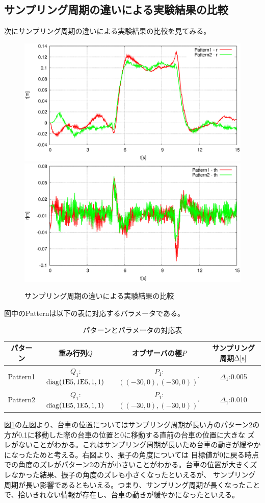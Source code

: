 	\subsection{サンプリング周期の違いによる実験結果の比較}
	次にサンプリング周期の違いによる実験結果の比較を見てみる。
	\begin{figure}[H]
		\centering
		\includegraphics[width=0.49\linewidth]{gazo/Compare_dt_R2.eps}
		\includegraphics[width=0.49\linewidth]{gazo/Compare_dt_TH2.eps}
		\caption{サンプリング周期の違いによる実験結果の比較}
		\label{image:comp_dt}
	\end{figure}
	図中のPatternは以下の表に対応するパラメータである。
	\begin{table}[H]
		\begin{center}
			\caption{パターンとパラメータの対応表}
			\medskip
			
			\begin{tabular}{|c|c|c|c|}\hline
				パターン & 重み行列$Q$ & オブザーバの極$P$ & サンプリング周期$\Delta[\rm{s}]$ \\ \hline\hline
				Pattern1 & $Q_1$:$\rm{diag}(1E5,1E5,1,1)$ & $P_1$:$((-30,0),(-30,0))^{'}$ & $\Delta_1$:0.005 \\ \hline
				Pattern2 & $Q_1$:$\rm{diag}(1E5,1E5,1,1)$ & $P_1$:$((-30,0),(-30,0))^{'}$ & $\Delta_1$:0.010 \\ \hline
			\end{tabular}
		\end{center}
		\label{table:huriage_control}
	\end{table}
	図\ref{image:comp_dt}の左図より、台車の位置についてはサンプリング周期が長い方のパターン2の方が0.1に移動した際の台車の位置と0に移動する直前の台車の位置に大きな
	ズレがないことがわかる。これはサンプリング周期が長いため台車の動きが緩やかになったためと考える。右図より、振子の角度については
	目標値が0に戻る時点での角度のズレがパターン2の方が小さいことがわかる。台車の位置が大きくズレなかった結果、振子の角度のズレも小さくなったといえるが、
	サンプリング周期が長い影響であるともいえる。つまり、サンプリング周期が長くなったことで、拾いきれない情報が存在し、台車の動きが緩やかになったといえる。
	\newpage
